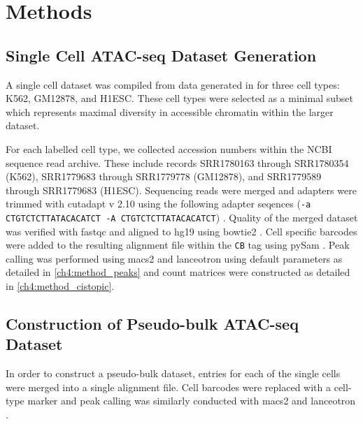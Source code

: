 

\section{Methods} \label{ch4:methods}


\subsection{Single Cell ATAC-seq Dataset Generation} \label{methods:sc_ds}

A single cell dataset was compiled from data generated in \textcite{Buenrostro2015} for three cell types: K562, GM12878, and H1ESC. These cell types were selected as a minimal subset which represents maximal diversity in accessible chromatin within the larger dataset. 

For each labelled cell type, we collected accession numbers within the NCBI sequence read archive. These include records SRR1780163 through SRR1780354 (K562), SRR1779683 through SRR1779778 (GM12878), and SRR1779589 through SRR1779683 (H1ESC). Sequencing reads were merged and adapters were trimmed with cutadapt v 2.10 using the following adapter seqences ({\tt -a CTGTCTCTTATACACATCT -A CTGTCTCTTATACACATCT}) \cite{Martin2011}. Quality of the merged dataset was verified with fastqc and aligned to hg19 using bowtie2 \cite{Andrews2010, Langmead2013}. Cell specific barcodes were added to the resulting alignment file within the {\tt CB} tag using pySam \cite{Heger2009}. Peak calling was performed using macs2 and lanceotron using default parameters \cite{Gaspar2018, Hentges2021} as detailed in \autoref{ch4:method_peaks} and count matrices were constructed as detailed in \autoref{ch4:method_cistopic}.

\subsection{Construction of Pseudo-bulk ATAC-seq Dataset}

In order to construct a pseudo-bulk dataset, entries for each of the single cells were merged into a single alignment file. Cell barcodes were replaced with a cell-type marker and peak calling was similarly conducted with macs2 and lanceotron \cite{Gaspar2018, Hentges2021}.


